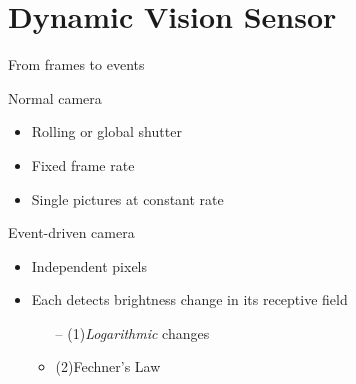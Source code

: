 \documentclass[11pt,center]{beamer}
\begin{document}
\section{Dynamic Vision Sensor}

	\begin{frame}{From frames to events}
		\begin{block}{Normal camera}
			\pause
			\begin{itemize}
			  \item Rolling or global shutter
				\item Fixed frame rate
				\item Single pictures at constant rate
			\end{itemize}
		\end{block}
		\pause
		\begin{block}{Event-driven camera}
			\pause
			\begin{itemize}
				\item Independent pixels
				\item Each detects brightness change in its receptive field
				\begin{itemize}
					\item[--] \hskip5pt \spot<5->(1){\em{Logarithmic}} changes
					\item[]
					\item<5>[] (2){Fechner's Law}
				\end{itemize}
				\pause
			\end{itemize}
		\end{block}
	\end{frame}
\end{document}
